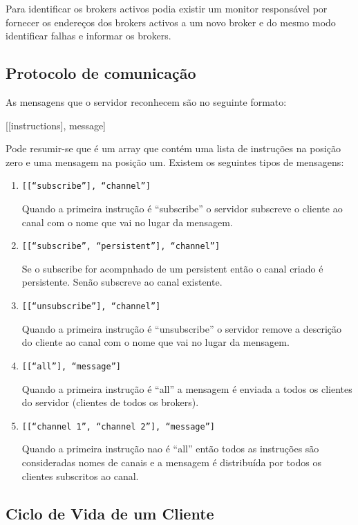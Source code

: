 Para identificar os brokers activos podia existir um monitor responsável por fornecer os endereços dos brokers activos a um novo broker e do mesmo modo identificar falhas e informar os brokers.

\subsection{Protocolo de comunicação}
\label{sec:protocolo}

As mensagens que o servidor reconhecem são no seguinte formato:

[[instructions], message]

Pode resumir-se que é um array que contém uma lista de instruções na posição zero e uma mensagem na posição um. Existem os seguintes tipos de mensagens:

\begin{enumerate}
\item
\texttt{[[``subscribe''], ``channel'']}

Quando a primeira instrução é ``subscribe'' o servidor subscreve o cliente ao canal com o nome que vai no lugar da mensagem.

\item
\texttt{[[``subscribe'', ``persistent''], ``channel'']}

Se o subscribe for acompnhado de um persistent então o canal criado é persistente. Senão subscreve ao canal existente.

\item
\texttt{[[``unsubscribe''], ``channel'']}

Quando a primeira instrução é ``unsubscribe'' o servidor remove a descrição do cliente ao canal com o nome que vai no lugar da mensagem.

\item
\texttt{[[``all''], ``message'']}

Quando a primeira instrução é ``all'' a mensagem é enviada a todos os clientes do servidor (clientes de todos os brokers).

\item
\texttt{[[``channel 1'', ``channel 2''], ``message'']}

Quando a primeira instrução nao é ``all'' então todos as instruções são consideradas nomes de canais e a mensagem é distribuída por todos os clientes subscritos ao canal.

\end{enumerate}

\subsection{Ciclo de Vida de um Cliente}

